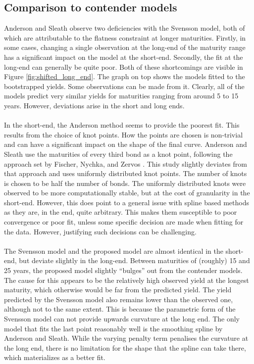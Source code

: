 \documentclass[a4paper]{artikel3}
\numberwithin{equation}{section}
\numberwithin{theorem}{section}
\numberwithin{proposition}{section}
\numberwithin{lemma}{section}
\begin{document}
\subsection{Comparison to contender models}
\label{sec:comparison}


Anderson and Sleath \cite{anderson_sleath_1999} observe two deficiencies with the Svensson model, both of which are attributable to the flatness constraint at longer maturities. Firstly, in some cases, changing a single observation at the long-end of the maturity range has a significant impact on the model at the short-end. Secondly, the fit at the long-end can generally be quite poor. Both of these shortcomings are visible in Figure \ref{fig:shifted_long_end}. The graph on top shows the models fitted to the bootstrapped yields. Some observations can be made from it. Clearly, all of the models predict very similar yields for maturities ranging from around 5 to 15 years. However, deviations arise in the short and long ends. \\
\\
In the short-end, the Anderson method seems to provide the poorest fit. This results from the choice of knot points. How the points are chosen is non-trivial and can have a significant impact on the shape of the final curve. Anderson and Sleath use the maturities of every third bond as a knot point, following the approach set by Fischer, Nychka, and Zervos \cite{fisher_nychka_zervos_1995}. This study slightly deviates from that approach and uses uniformly distributed knot points. The number of knots is chosen to be half the number of bonds. The uniformly distributed knots were observed to be more computationally stable, but at the cost of granularity in the short-end. However, this does point to a general issue with spline based methods as they are, in the end, quite arbitrary. This makes them susceptible to poor convergence or poor fit, unless some specific decision are made when fitting for the data. However, justifying such decisions can be challenging. \\
\\
The Svensson model and the proposed model are almost identical in the short-end, but deviate slightly in the long-end. Between maturities of (roughly) 15 and 25 years, the proposed model slightly ``bulges'' out from the contender models. The cause for this appears to be the relatively high observed yield at the longest maturity, which otherwise would be far from the predicted yield. The yield predicted by the Svensson model also remains lower than the observed one, although not to the same extent. This is because the parametric form of the Svensson model can not provide upwards curvature at the long end. The only model that fits the last point reasonably well is the smoothing spline by Anderson and Sleath. While the varying penalty term penalises the curvature at the long end, there is no limitation for the shape that the spline can take there, which materializes as a better fit. \\
\end{document}
